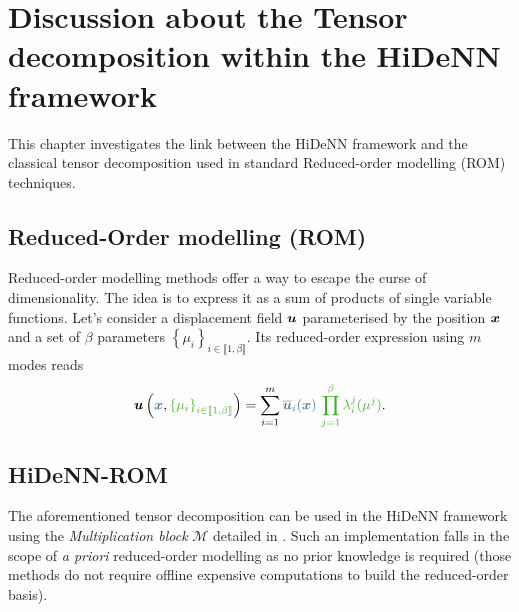 \chapter[Tensor decomposition]{Discussion about the Tensor decomposition within the HiDeNN framework}
\label{chap:TD}
\begin{chapabstract}
    This chapter investigates the link between the HiDeNN framework and the classical tensor decomposition used in standard Reduced-order modelling (ROM) techniques.
\end{chapabstract}

\minitoc
\section{Reduced-Order modelling (ROM)}

    Reduced-order modelling methods offer a way to escape the curse of dimensionality. The idea is to express it as a sum of products of single variable functions. Let's consider a displacement field $\boldsymbol{u}$ parameterised by the position $\boldsymbol{x}$ and a set of $\beta$ parameters $\left\{\mu_i\right\}_{i \in \llbracket 1, \beta \rrbracket}$. Its reduced-order expression using $m$ modes reads
    \begin{equation}
        \vect{u}\left(\textcolor{BleuLMS!70}{\vect{x}}, \textcolor{LGreenLMS}{\left\{\mu_i\right\}_{i \in \llbracket 1, \beta \rrbracket}}\right) = \sum\limits_{i=1}^m \textcolor{BleuLMS!70}{\overline{\vect{u}}_i(\vect{x})} ~\textcolor{LGreenLMS}{\prod_{j=1}^{\beta}\lambda_i^j(\mu^j)}.
    \end{equation}

\section{HiDeNN-ROM}



The aforementioned tensor decomposition can be used in the HiDeNN framework \parencite{zhang_hidenn-td_2022} using the \emph{Multiplication block} $\mathcal{M}$ detailed in \parencite{zhang_hierarchical_2021}. Such an implementation falls in the scope of \emph{a priori} reduced-order modelling \parencite{ryckelynck_thea_2006,chinesta_short_2011} as no prior knowledge is required (those methods do not require offline expensive computations to build the reduced-order basis).

